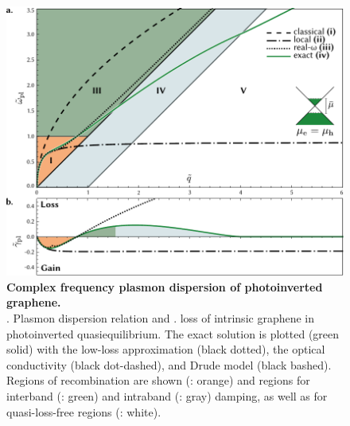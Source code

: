 \begin{figure}
 \includegraphics{figs/gr/PlasDispInv.pdf}
 \caption[
Complex frequency plasmon dispersion of photoinverted graphene]{
\label{fig:PlasDispInv} \textbf{Complex frequency plasmon dispersion of
photoinverted graphene.}\small\\
\subA. Plasmon dispersion relation and \subB. loss of intrinsic graphene in
photoinverted quasiequilibrium.
The exact \rpa solution \cfpd is plotted (green solid) with the low-loss
approximation (black dotted), the optical conductivity (black dot-dashed), and
Drude model (black bashed).
Regions of recombination are shown (\I: orange) and regions for interband
(\III: green) and intraband (\IV: gray) damping, as well as for
quasi-loss-free regions (\V: white).
}
\end{figure}

